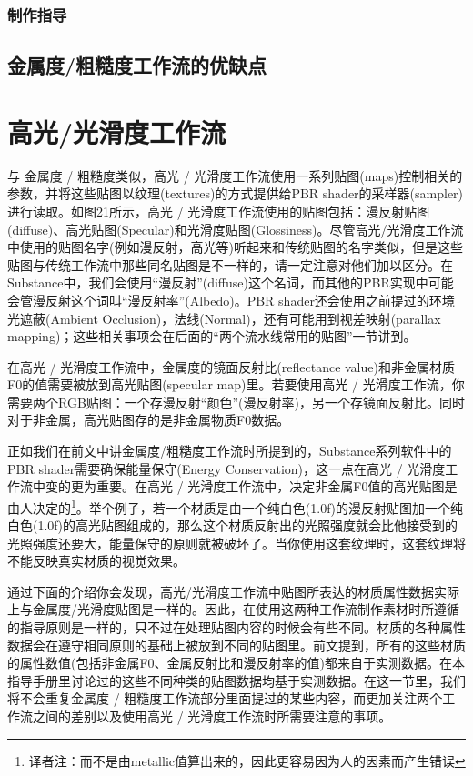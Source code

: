 \subsubsection{制作指导}

\subsection{金属度/粗糙度工作流的优缺点}

\section{高光/光滑度工作流}

与 金属度 / 粗糙度类似，高光 / 光滑度工作流使用一系列贴图(maps)控制相关的参数，并将这些贴图以纹理(textures)的方式提供给PBR shader的采样器(sampler)进行读取。如图21所示，高光 / 光滑度工作流使用的贴图包括：漫反射贴图(diffuse)、高光贴图(Specular)和光滑度贴图(Glossiness)。尽管高光/光滑度工作流中使用的贴图名字(例如漫反射，高光等)听起来和传统贴图的名字类似，但是这些贴图与传统工作流中那些同名贴图是不一样的，请一定注意对他们加以区分。在Substance中，我们会使用“漫反射”(diffuse)这个名词，而其他的PBR实现中可能会管漫反射这个词叫“漫反射率”(Albedo)。PBR shader还会使用之前提过的环境光遮蔽(Ambient Occlusion)，法线(Normal)，还有可能用到视差映射(parallax mapping)；这些相关事项会在后面的“两个流水线常用的贴图”一节讲到。

在高光 / 光滑度工作流中，金属度的镜面反射比(reflectance value)和非金属材质F0的值需要被放到高光贴图(specular map)里。若要使用高光 / 光滑度工作流，你需要两个RGB贴图：一个存漫反射“颜色”(漫反射率)，另一个存镜面反射比。同时对于非金属，高光贴图存的是非金属物质F0数据。

正如我们在前文中讲金属度/粗糙度工作流时所提到的，Substance系列软件中的PBR shader需要确保能量保守(Energy Conservation)，这一点在高光 / 光滑度工作流中变的更为重要。在高光 / 光滑度工作流中，决定非金属F0值的高光贴图是由人决定的\footnote{译者注：而不是由metallic值算出来的，因此更容易因为人的因素而产生错误}。举个例子，若一个材质是由一个纯白色(1.0f)的漫反射贴图加一个纯白色(1.0f)的高光贴图组成的，那么这个材质反射出的光照强度就会比他接受到的光照强度还要大，能量保守的原则就被破坏了。当你使用这套纹理时，这套纹理将不能反映真实材质的视觉效果。

通过下面的介绍你会发现，高光/光滑度工作流中贴图所表达的材质属性数据实际上与金属度/光滑度贴图是一样的。因此，在使用这两种工作流制作素材时所遵循的指导原则是一样的，只不过在处理贴图内容的时候会有些不同。材质的各种属性数据会在遵守相同原则的基础上被放到不同的贴图里。前文提到，所有的这些材质的属性数值(包括非金属F0、金属反射比和漫反射率的值)都来自于实测数据。在本指导手册里讨论过的这些不同种类的贴图数据均基于实测数据。在这一节里，我们将不会重复金属度 / 粗糙度工作流部分里面提过的某些内容，而更加关注两个工作流之间的差别以及使用高光 / 光滑度工作流时所需要注意的事项。

